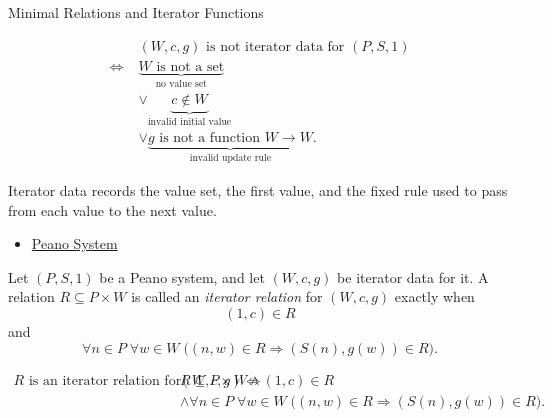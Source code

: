 \begin{topicbox}{Minimal Relations and Iterator Functions}
\begin{remark*}
\[
\begin{aligned}
&(W,c,g) \text{ is not iterator data for } (P,S,1)\\
\Longleftrightarrow\;&
\underbrace{W \text{ is not a set}}_{\text{no value set}}\\
&\lor \underbrace{c\notin W}_{\text{invalid initial value}}\\
&\lor \underbrace{g \text{ is not a function } W\to W}_{\text{invalid update rule}}.
\end{aligned}
\]
\end{remark*}

\begin{remark*}[Interpretation]
Iterator data records the value set, the first value, and the fixed rule used
to pass from each value to the next value.
\end{remark*}

\begin{dependencies}
\begin{itemize}
  \item \hyperref[def:peano-system]{Peano System}
\end{itemize}
\end{dependencies}

\begin{tcolorbox}[colback=defbox, colframe=defborder, arc=2pt,
  left=6pt, right=6pt, top=4pt, bottom=4pt,
  title={\small\textbf{Definition (Iterator Relation)}},
  fonttitle=\small\bfseries]
\begin{definition}
\label{def:iterator-relation}
Let $(P,S,1)$ be a Peano system, and let $(W,c,g)$ be iterator data for it. A
relation $R\subseteq P\times W$ is called an \emph{iterator relation} for
$(W,c,g)$ exactly when
\[
(1,c)\in R
\]
and
\[
\forall n\in P\;\forall w\in W\;
\bigl((n,w)\in R\Longrightarrow (S(n),g(w))\in R\bigr).
\]
\end{definition}
\end{tcolorbox}

\begin{remark*}
\[
\begin{aligned}
R \text{ is an iterator relation for } (W,c,g)
\Longleftrightarrow\;&
R\subseteq P\times W
\land (1,c)\in R\\
&\land
\forall n\in P\;\forall w\in W\;
\bigl((n,w)\in R\Longrightarrow (S(n),g(w))\in R\bigr).
\end{aligned}
\]
\end{remark*}


\end{topicbox}
